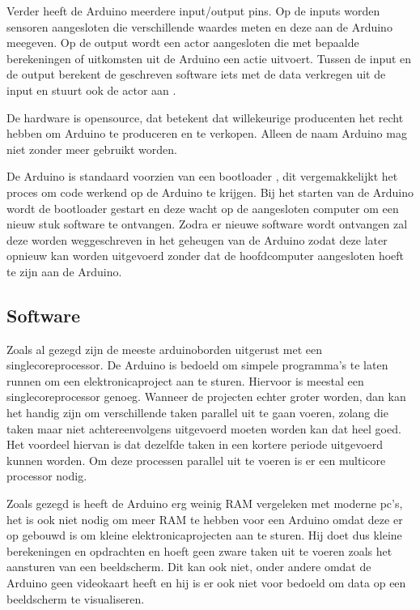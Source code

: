 \documentclass[a4paper, dutch, abstract=true]{scrartcl}
\begin{document}
Verder heeft de Arduino meerdere input/output pins.
Op de inputs worden sensoren aangesloten die verschillende waardes meten en deze aan de Arduino
meegeven.
Op de output wordt een actor aangesloten die met bepaalde berekeningen of uitkomsten uit de Arduino
een actie uitvoert.
Tussen de input en de output berekent de geschreven software iets met de data verkregen uit de input
en stuurt ook de actor aan \cite{arduinoreference}.

De hardware is opensource, dat betekent dat willekeurige producenten het recht hebben om Arduino te
produceren en te verkopen.
Alleen de naam Arduino mag niet zonder meer gebruikt worden.

De Arduino is standaard voorzien van een bootloader \cite{optiboot2019github}, dit vergemakkelijkt
het proces om code werkend op de Arduino te krijgen.
Bij het starten van de Arduino wordt de bootloader gestart en deze wacht op de aangesloten computer
om een nieuw stuk software te ontvangen.
Zodra er nieuwe software wordt ontvangen zal deze worden weggeschreven in het geheugen van de
Arduino zodat deze later opnieuw kan worden uitgevoerd zonder dat de hoofdcomputer aangesloten hoeft
te zijn aan de Arduino.

\subsection{Software}
Zoals al gezegd zijn de meeste arduinoborden uitgerust met een singlecoreprocessor.
De Arduino is bedoeld om simpele programma's te laten runnen om een elektronicaproject aan te
sturen.
Hiervoor is meestal een singlecoreprocessor genoeg.
Wanneer de projecten echter groter worden, dan kan het handig zijn om verschillende taken parallel
uit te gaan voeren, zolang die taken maar niet achtereenvolgens uitgevoerd moeten worden kan dat
heel goed.
Het voordeel hiervan is dat dezelfde taken in een kortere periode uitgevoerd kunnen worden.
Om deze processen parallel uit te voeren is er een multicore processor nodig.

Zoals gezegd is heeft de Arduino erg weinig RAM vergeleken met moderne pc's, het is ook niet nodig
om meer RAM te hebben voor een Arduino omdat deze er op gebouwd is om kleine elektronicaprojecten
aan te sturen.
Hij doet dus kleine berekeningen en opdrachten en hoeft geen zware taken uit te voeren zoals het
aansturen van een beeldscherm.
Dit kan ook niet, onder andere omdat de Arduino geen videokaart heeft en hij is er ook niet voor
bedoeld om data op een beeldscherm te visualiseren.
\end{document}
